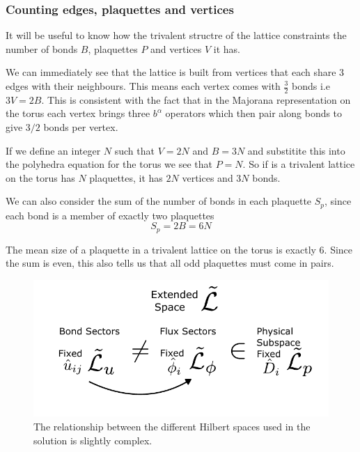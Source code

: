 \hypertarget{counting-edges-plaquettes-and-vertices}{%
\subsubsection{Counting edges, plaquettes and
vertices}\label{counting-edges-plaquettes-and-vertices}}

It will be useful to know how the trivalent structre of the lattice
constraints the number of bonds \(B\), plaquettes \(P\) and vertices
\(V\) it has.

We can immediately see that the lattice is built from vertices that each
share 3 edges with their neighbours. This means each vertex comes with
\(\tfrac{3}{2}\) bonds i.e \(3V = 2B\). This is consistent with the fact
that in the Majorana representation on the torus each vertex brings
three \(b^\alpha\) operators which then pair along bonds to give \(3/2\)
bonds per vertex.

If we define an integer \(N\) such that \(V = 2N\) and \(B = 3N\) and
substitite this into the polyhedra equation for the torus we see that
\(P = N\). So if is a trivalent lattice on the torus has \(N\)
plaquettes, it has \(2N\) vertices and \(3N\) bonds.

We can also consider the sum of the number of bonds in each plaquette
\(S_p\), since each bond is a member of exactly two plaquettes
\[S_p = 2B = 6N\]

The mean size of a plaquette in a trivalent lattice on the torus is
exactly 6. Since the sum is even, this also tells us that all odd
plaquettes must come in pairs.

\begin{figure}
\hypertarget{fig:hilbert_spaces}{%
\centering
\includegraphics[width=1\textwidth,height=\textheight]{figure_code/amk_chapter/hilbert_spaces.pdf}
\caption{The relationship between the different Hilbert spaces used in
the solution is slightly complex.}\label{fig:hilbert_spaces}
}
\end{figure}

